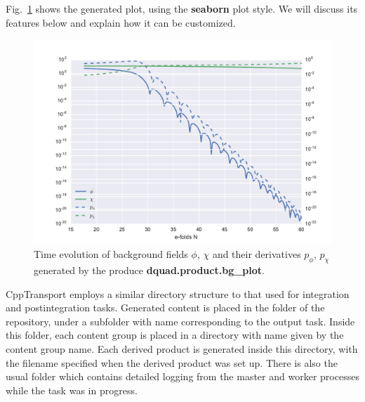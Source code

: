 \documentclass[11pt,a4paper]{article}
\renewcommand{\texttt}[1]{{\ttfamily\fontseries{l}\selectfont{#1}}}
\newcommand{\repoobject}[1]{{\ttfamily\bfseries\small #1}}
\newcommand{\packagefont}{\sffamily}
\newcommand{\CppTransport}{{\packagefont CppTransport}}
\newcommand{\file}[1]{\texttt{{#1}}}
\newcommand{\option}[1]{{\ttfamily\bfseries\small #1}}
\begin{document}
Fig.~\ref{fig:background-plot} shows the generated plot, using the
\option{seaborn} plot style.
We will discuss its features below and explain how it can be customized.
\begin{figure}
	\begin{center}
		\includegraphics[scale=0.75]{Outputs/background}	
	\end{center}
	\caption{\label{fig:background-plot}Time evolution of background fields $\phi$, $\chi$ and their
	derivatives $p_\phi$, $p_\chi$ generated by the produce
	\repoobject{dquad.product.bg\_plot}.}
\end{figure}

{\CppTransport} employs a similar directory structure to that
used for integration and postintegration tasks.
Generated content is placed in the \file{output} folder of the repository,
under a subfolder with name corresponding to the output task.
Inside this folder, each content group
is placed in a directory with name given by the content group name.
Each derived product is generated inside this directory, with the filename
specified when the derived product was set up.
There is also the usual \file{logs} folder which contains detailed logging
from the master and worker processes while the task was in progress.
\end{document}

